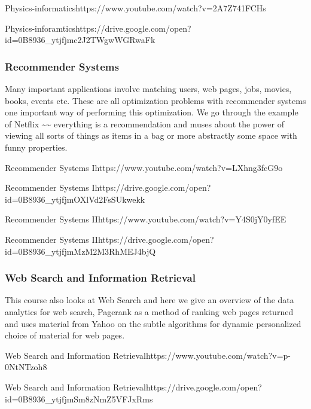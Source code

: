   {Physics-informatics}{https://www.youtube.com/watch?v=2A7Z741FCHs}

  {Physics-inforamtics}{https://drive.google.com/open?id=0B8936_ytjfjmc2J2TWgwWGRwaFk}


\subsubsection{Recommender Systems}\label{recommender-systems}

Many important applications involve matching users, web pages, jobs,
movies, books, events etc. These are all optimization problems with
recommender systems one important way of performing this optimization.
We go through the example of Netflix \textasciitilde{}\textasciitilde{}
everything is a recommendation and muses about the power of viewing all
sorts of things as items in a bag or more abstractly some space with
funny properties.


  {Recommender Systems  I}{https://www.youtube.com/watch?v=LXhng3fcG9o}



  {Recommender  Systems I}{https://drive.google.com/open?id=0B8936_ytjfjmOXlVd2FsSUkwekk}



  {Recommender Systems
  II}{https://www.youtube.com/watch?v=Y4S0jY0yfEE}

  {Recommender
  Systems II}{https://drive.google.com/open?id=0B8936_ytjfjmMzM2M3RhMEJ4bjQ}


\subsubsection{Web Search and Information
Retrieval}\label{web-search-and-information-retrieval}

This course also looks at Web Search and here we give an overview of the
data analytics for web search, Pagerank as a method of ranking web pages
returned and uses material from Yahoo on the subtle algorithms for
dynamic personalized choice of material for web pages.


   {Web Search and  Information Retrieval}{https://www.youtube.com/watch?v=p-0NtNTzoh8}


  {Web  Search and Information Retrieval}{https://drive.google.com/open?id=0B8936_ytjfjmSm8zNmZ5VFJxRms}


